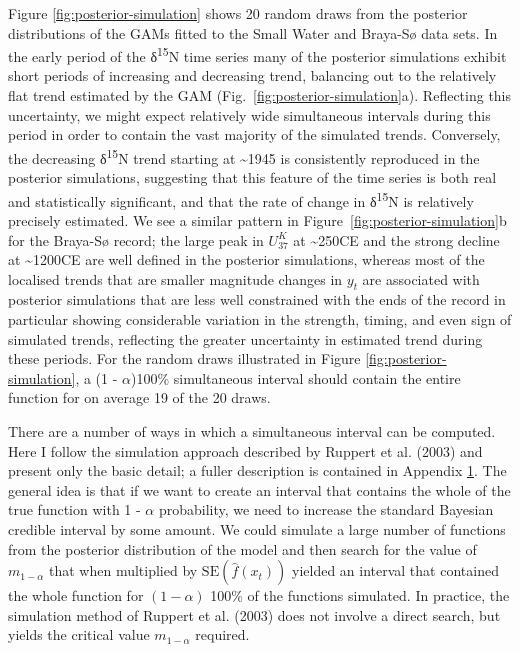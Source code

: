 \documentclass[12pt,]{article}
\newcommand{\uk}{\ensuremath{\mathit{U}^{\mathit{K}}_{\mathup{37}}}}
\begin{document}
Figure \ref{fig:posterior-simulation} shows 20 random draws from the
posterior distributions of the GAMs fitted to the Small Water and
Braya-Sø data sets. In the early period of the δ\textsuperscript{15}N
time series many of the posterior simulations exhibit short periods of
increasing and decreasing trend, balancing out to the relatively flat
trend estimated by the GAM (Fig.~\ref{fig:posterior-simulation}a).
Reflecting this uncertainty, we might expect relatively wide
simultaneous intervals during this period in order to contain the vast
majority of the simulated trends. Conversely, the decreasing
δ\textsuperscript{15}N trend starting at \textasciitilde{}1945 is
consistently reproduced in the posterior simulations, suggesting that
this feature of the time series is both real and statistically
significant, and that the rate of change in δ\textsuperscript{15}N is
relatively precisely estimated. We see a similar pattern in
Figure~\ref{fig:posterior-simulation}b for the Braya-Sø record; the
large peak in \uk{} at \textasciitilde{}250CE and the strong decline at
\textasciitilde{}1200CE are well defined in the posterior simulations,
whereas most of the localised trends that are smaller magnitude changes
in \(y_t\) are associated with posterior simulations that are less well
constrained with the ends of the record in particular showing
considerable variation in the strength, timing, and even sign of
simulated trends, reflecting the greater uncertainty in estimated trend
during these periods. For the random draws illustrated in Figure
\ref{fig:posterior-simulation}, a (1 - \(\alpha\))100\% simultaneous
interval should contain the entire function for on average 19 of the 20
draws.

There are a number of ways in which a simultaneous interval can be
computed. Here I follow the simulation approach described by Ruppert et
al. (2003) and present only the basic detail; a fuller description is
contained in Appendix \protect\hyperlink{appendix}{1}. The general idea
is that if we want to create an interval that contains the whole of the
true function with 1 - \(\alpha\) probability, we need to increase the
standard Bayesian credible interval by some amount. We could simulate a
large number of functions from the posterior distribution of the model
and then search for the value of \(m_{1-\alpha}\) that when multiplied
by \(\text{SE}(\hat{f}(x_t))\) yielded an interval that contained the
whole function for \((1-\alpha)\) 100\% of the functions simulated. In
practice, the simulation method of Ruppert et al. (2003) does not
involve a direct search, but yields the critical value \(m_{1-\alpha}\)
required.
\end{document}
